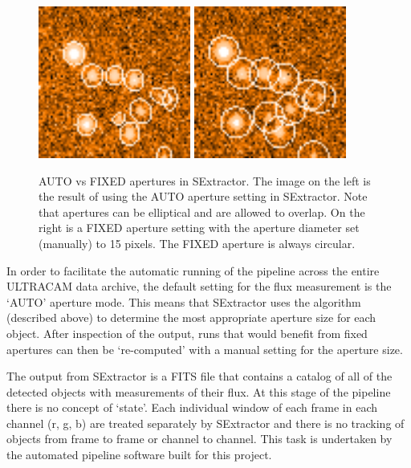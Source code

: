 \begin{enumerate}
\begin{figure}
  \centering
  \includegraphics[width=50mm]{images/sex_apertures_auto_cropped.png}
  \includegraphics[width=50mm]{images/sex_apertures_fixed_cropped.png}
  \caption{AUTO vs FIXED apertures in SExtractor. The image on the left is the result of using the AUTO aperture setting in SExtractor. Note that apertures can be elliptical and are allowed to overlap. On the right is a FIXED aperture setting with the aperture diameter set (manually) to 15 pixels. The FIXED aperture is always circular.}
\label{fig:fixedautoapertures}
\end{figure}
\end{enumerate}

In order to facilitate the automatic running of the pipeline across the entire ULTRACAM data archive, the default setting for the flux measurement is the `AUTO' aperture mode. This means that SExtractor uses the algorithm (described above) to determine the most appropriate aperture size for each object. After inspection of the output, runs that would benefit from fixed apertures can then be `re-computed' with a manual setting for the aperture size. 

The output from SExtractor is a FITS file that contains a catalog of all of the detected objects with measurements of their flux. At this stage of the pipeline there is no concept of `state'. Each individual window of each frame in each channel (r, g, b) are treated separately by SExtractor and there is no tracking of objects from frame to frame or channel to channel. This task is undertaken by the automated pipeline software built for this project. 

